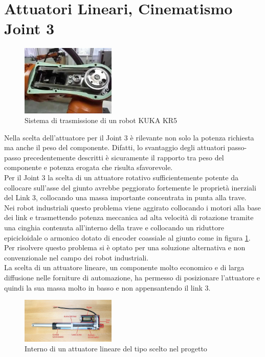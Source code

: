 \documentclass[%
corpo=11pt,
twoside,
 stile=classica,
oldstyle,
greek,%
]{toptesi}
\begin{document}
		
	
	
	\section{Attuatori Lineari, Cinematismo Joint 3}
	\begin{figure}
		\centering
		\includegraphics[width=0.4\textwidth]{image/kukabelt.jpg}
		\caption{Sistema di trasmissione di un robot KUKA KR5}
		\label{fig:kukabelt}
	\end{figure}
	Nella scelta dell'attuatore per il Joint 3 è rilevante non solo la potenza richiesta ma anche il peso del componente. Difatti, lo svantaggio degli attuatori passo-passo precedentemente descritti è sicuramente il rapporto tra peso del componente e potenza erogata che risulta sfavorevole.\\
	Per il Joint 3 la scelta di un attuatore rotativo sufficientemente potente da collocare sull'asse del giunto avrebbe peggiorato fortemente le proprietà inerziali del Link 3, collocando una massa importante concentrata in punta alla trave. \\
	Nei robot industriali questo problema viene aggirato collocando i motori alla base dei link e trasmettendo potenza meccanica ad alta velocità di rotazione tramite una cinghia contenuta all'interno della trave e collocando un riduttore epicicloidale o armonico dotato di encoder coassiale al giunto come in figura \ref{fig:kukabelt}. \\
	Per risolvere questo problema si è optato per una soluzione alternativa e non convenzionale nel campo dei robot industriali. 
	\\
	La scelta di un attuatore lineare, un componente molto economico e di larga diffusione nelle forniture di automazione, ha permesso di posizionare l'attuatore e quindi la sua massa molto in basso e non appensantendo il link 3. \\
		\begin{figure}
		\centering
		\includegraphics[width=0.4\textwidth]{image/linearact.jpg}
		\caption{Interno di un attuatore lineare del tipo scelto nel progetto }
		\label{fig:linearact}
	\end{figure}
\end{document}
